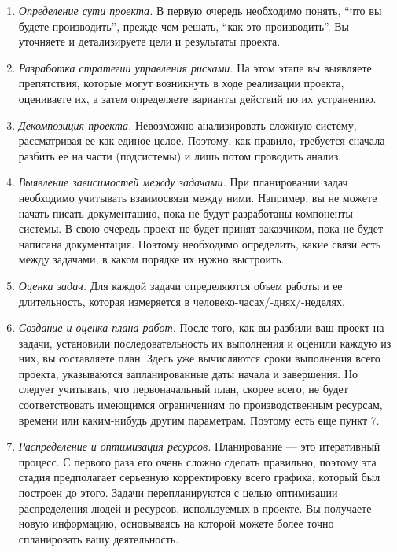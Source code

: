 \documentclass{../../text-style}
\begin{document}
\begin{enumerate}
    \item \emph{Определение сути проекта.} В первую очередь необходимо понять, \enquote{что вы будете производить}, прежде чем решать, \enquote{как это производить}. Вы уточняете и детализируете цели и результаты проекта.
    \item \emph{Разработка стратегии управления рисками.} На этом этапе вы выявляете препятствия, которые могут возникнуть в ходе реализации проекта, оцениваете их, а затем определяете варианты действий по их устранению.
    \item \emph{Декомпозиция проекта.} Невозможно анализировать сложную систему, рассматривая ее как единое целое. Поэтому, как правило, требуется сначала разбить ее на части (подсистемы) и лишь потом проводить анализ.
    \item \emph{Выявление зависимостей между задачами.} При планировании задач необходимо учитывать взаимосвязи между ними. Например, вы не можете начать писать документацию, пока не будут разработаны компоненты системы. В свою очередь проект не будет принят заказчиком, пока не будет написана документация. Поэтому необходимо определить, какие связи есть между задачами, в каком порядке их нужно выстроить.
    \item \emph{Оценка задач.} Для каждой задачи определяются объем работы и ее длительность, которая измеряется в человеко-часах/-днях/-неделях.
    \item \emph{Создание и оценка плана работ.} После того, как вы разбили ваш проект на задачи, установили последовательность их выполнения и оценили каждую из них, вы составляете план. Здесь уже вычисляются сроки выполнения всего проекта, указываются запланированные даты начала и завершения. Но следует учитывать, что первоначальный план, скорее всего, не будет соответствовать имеющимся ограничениям по производственным ресурсам, времени или каким-нибудь другим параметрам. Поэтому есть еще пункт 7.
    \item \emph{Распределение и оптимизация ресурсов.} Планирование --- это итеративный процесс. С первого раза его очень сложно сделать правильно, поэтому эта стадия предполагает серьезную корректировку всего графика, который был построен до этого. Задачи перепланируются с целью оптимизации распределения людей и ресурсов, используемых в проекте. Вы получаете новую информацию, основываясь на которой можете более точно спланировать вашу деятельность.
\end{enumerate}
\end{document}
